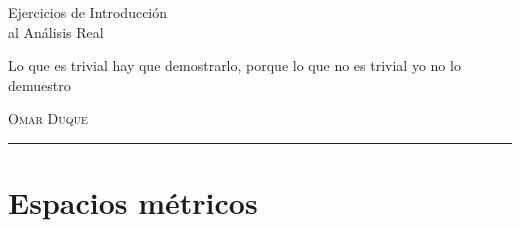 \documentclass[12pt,a4paper]{report}
\begin{document}
\begin{titlepage}
\vspace*{2cm}

\noindent
\vspace*{0.5cm}
\titlefont Ejercicios de Introducción\\ al Análisis Real \par
\vspace{1.5cm}
\epigraph{Lo que es trivial hay que demostrarlo, porque lo que no es trivial yo no lo demuestro}%
{ \textsc{Omar Duque}}
\null\vfill
\vspace*{1cm}
\noindent
\hfill
\begin{minipage}{0.45\linewidth}
    \begin{flushright}
        \printauthor
    \end{flushright}
\end{minipage}
%
\begin{minipage}{0.02\linewidth}
    \rule{1pt}{120pt}
\end{minipage}
\titlepagedecoration
\end{titlepage}


\tableofcontents
\cleardoublepage


\chapter{Espacios métricos}

\end{document}

